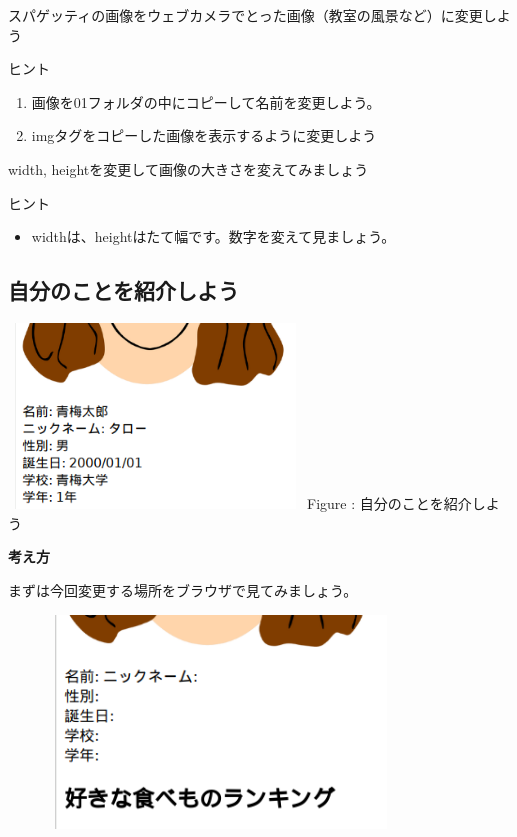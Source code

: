 \documentclass[a4paper,12pt]{jarticle}
\begin{document}
\theQuestion

スパゲッティの画像をウェブカメラでとった画像（教室の風景など）に変更しよう

ヒント

\begin{enumerate}
  \item
        画像を01フォルダの中にコピーして名前を変更しよう。
  \item
        imgタグをコピーした画像を表示するように変更しよう
\end{enumerate}
\theQuestion\label{Q:hasAnswer04-3}

width,
heightを変更して画像の大きさを変えてみましょう

ヒント

\begin{itemize}
  \item
        widthは、heightはたて幅です。数字を変えて見ましょう。
\end{itemize}


\clearpage
{}
\subsection{\theExercise 自分のことを紹介しよう}
\centering
\begin{minipage}{7.788cm}
  \includegraphics[width=7.788cm,height=4.927cm]{textbook-img173.png}
  \newline
  Figure : 自分のことを紹介しよう
\end{minipage}

\bigskip

\flushleft

\textbf{考え方}


\bigskip

まずは今回変更する場所をブラウザで見てみましょう。

\centering
\includegraphics[width=11.28cm,height=5.667cm]{textbook-img175.png}
\end{document}
